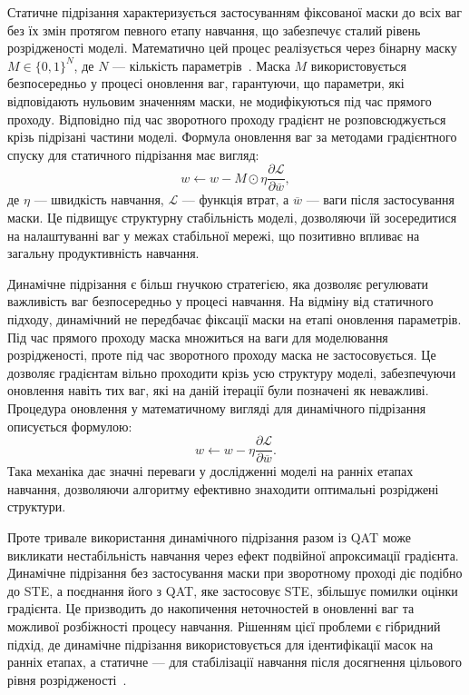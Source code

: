 \documentclass{pma-mthesis}
\begin{document}
Статичне підрізання характеризується застосуванням фіксованої маски до всіх ваг без їх змін протягом певного етапу навчання, що забезпечує сталий рівень розрідженості моделі. Математично цей процес реалізується через бінарну маску $M \in \{0, 1\}^N$, де $N$ --- кількість параметрів~\cite{10946020}. Маска $M$ використовується безпосередньо у процесі оновлення ваг, гарантуючи, що параметри, які відповідають нульовим значенням маски, не модифікуються під час прямого проходу. Відповідно під час зворотного проходу градієнт не розповсюджується крізь підрізані частини моделі. Формула оновлення ваг за методами градієнтного спуску для статичного підрізання має вигляд:
\begin{equation}
    w \leftarrow w - M \odot \eta \frac{\partial\mathcal{L}}{\partial\overline{w}},
\end{equation}
де $\eta$ --- швидкість навчання, $\mathcal{L}$ --- функція втрат, а $\overline{w}$ --- ваги після застосування маски. Це підвищує структурну стабільність моделі, дозволяючи їй зосередитися на налаштуванні ваг у межах стабільної мережі, що позитивно впливає на загальну продуктивність навчання.

Динамічне підрізання є більш гнучкою стратегією, яка дозволяє регулювати важливість ваг безпосередньо у процесі навчання. На відміну від статичного підходу, динамічний не передбачає фіксації маски на етапі оновлення параметрів. Під час прямого проходу маска множиться на ваги для моделювання розрідженості, проте під час зворотного проходу маска не застосовується. Це дозволяє градієнтам вільно проходити крізь усю структуру моделі, забезпечуючи оновлення навіть тих ваг, які на даній ітерації були позначені як неважливі. Процедура оновлення у математичному вигляді для динамічного підрізання описується формулою:
\begin{equation}
    w \leftarrow w - \eta \frac{\partial\mathcal{L}}{\partial\overline{w}}.
\end{equation}
Така механіка дає значні переваги у дослідженні моделі на ранніх етапах навчання, дозволяючи алгоритму ефективно знаходити оптимальні розріджені структури.

Проте тривале використання динамічного підрізання разом із QAT може викликати нестабільність навчання через ефект подвійної апроксимації градієнта. Динамічне підрізання без застосування маски при зворотному проході діє подібно до STE, а поєднання його з QAT, яке застосовує STE, збільшує помилки оцінки градієнта. Це призводить до накопичення неточностей в оновленні ваг та можливої розбіжності процесу навчання. Рішенням цієї проблеми є гібридний підхід, де динамічне підрізання використовується для ідентифікації масок на ранніх етапах, а статичне --- для стабілізації навчання після досягнення цільового рівня розрідженості~\cite{10946020}.
\end{document}
